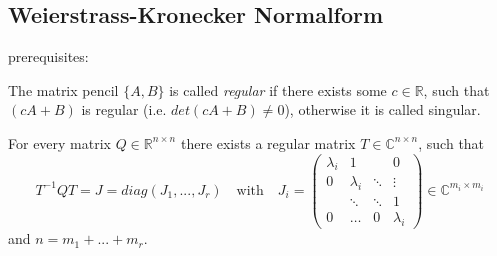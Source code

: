 	\subsection{Weierstrass-Kronecker Normalform}
	
	\begin{frame}
		prerequisites: \\
		\begin{definition}
			The matrix pencil $\{ A,B\}$ is called \emph{regular} if there exists some $c \in \mathbb{R}$, such that $(cA+B)$ is regular (i.e. $det(cA+B) \neq 0$), otherwise it is called singular.
		\end{definition}
		\begin{theorem}%
			For every matrix $Q \in \mathbb{R}^{n \times n}$ there exists a regular matrix $T \in \mathbb{C}^{n \times n}$, such that
			\begin{displaymath}
				T^{-1}QT = J = diag(J_1, ..., J_r) \quad \text{with} \quad J_i = 
				\left(
				\begin{matrix}
					\lambda_i & 1 & & 0 \\
					0 & \lambda_i & \ddots & \vdots \\
					& \ddots & \ddots & 1 \\
					0 & \hdots & 0 & \lambda_i
				\end{matrix}
				\right)
				\in \mathbb{C}^{m_i \times m_i}
			\end{displaymath} 
			and $n = m_1 + ... + m_r$.
		\end{theorem}
	\end{frame}
	
